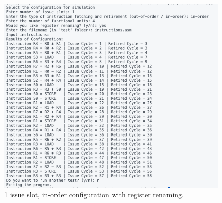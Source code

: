 \documentclass{article}
\begin{document}
\begin{enumerate}
\begin{figure}[H]
\begin{minipage}[t]{0.45\textwidth}
            \includegraphics[width=\textwidth]{Images/Config1_Renaming.png}
            \caption{1 issue slot, in-order configuration with register renaming.}
        \end{minipage}
    \end{figure}


\end{enumerate}
\end{document}
